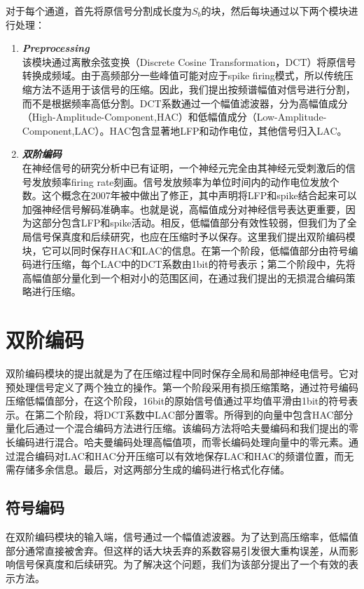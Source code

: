 对于每个通道，首先将原信号分割成长度为$S_b$的块，然后每块通过以下两个模块进行处理：\\
\begin{enumerate}[\sffamily a.]
\item{\textbf{\textit{Preprocessing}}}\\
该模块通过离散余弦变换（Discrete Cosine Transformation，DCT）将原信号转换成频域。由于高频部分一些峰值可能对应于spike firing模式，所以传统压缩方法不适用于该信号的压缩。因此，我们提出按频谱幅值对信号进行分割，而不是根据频率高低分割。DCT系数通过一个幅值滤波器，分为高幅值成分（High-Amplitude-Component,HAC）和低幅值成分（Low-Amplitude-Component,LAC）。HAC包含显著地LFP和动作电位，其他信号归入LAC。 
 
\item{\textbf{\textit{双阶编码}}}\\
在神经信号的研究分析中已有证明，一个神经元完全由其神经元受刺激后的信号发放频率firing rate刻画\cite{32}。信号发放频率为单位时间内的动作电位发放个数。这个概念在2007年被\cite{3}中做出了修正，其中声明将LFP和spike结合起来可以加强神经信号解码准确率。也就是说，高幅值成分对神经信号表达更重要，因为这部分包含LFP和spike活动。相反，低幅值部分有效性较弱，但我们为了全局信号保真度和后续研究，也应在压缩时予以保存。这里我们提出双阶编码模块，它可以同时保存HAC和LAC的信息。在第一个阶段，低幅值部分由符号编码进行压缩，每个LAC中的DCT系数由1bit的符号表示；第二个阶段中，先将高幅值部分量化到一个相对小的范围区间，在通过我们提出的无损混合编码策略进行压缩。
\end{enumerate}









\section{双阶编码}
双阶编码模块的提出就是为了在压缩过程中同时保存全局和局部神经电信号。它对预处理信号定义了两个独立的操作。第一个阶段采用有损压缩策略，通过符号编码压缩低幅值部分，在这个阶段，16bit的原始信号值通过平均值平滑由1bit的符号表示。在第二个阶段，将DCT系数中LAC部分置零。所得到的向量中包含HAC部分量化后通过一个混合编码方法进行压缩。该编码方法将哈夫曼编码和我们提出的零长编码进行混合。哈夫曼编码处理高幅值项，而零长编码处理向量中的零元素。通过混合编码对LAC和HAC分开压缩可以有效地保存LAC和HAC的频谱位置，而无需存储多余信息。最后，对这两部分生成的编码进行格式化存储。
 
 
 
\subsection{符号编码}
\label{sec:Symbol Encoding for Low-Amplitude Component}
在双阶编码模块的输入端，信号通过一个幅值滤波器。为了达到高压缩率，低幅值部分通常直接被舍弃。但这样的话大块丢弃的系数容易引发很大重构误差，从而影响信号保真度和后续研究。为了解决这个问题，我们为该部分提出了一个有效的表示方法。

